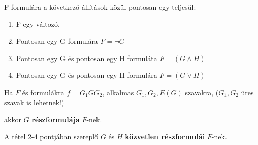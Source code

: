 \documentclass[10pt]{article}
\renewcommand{\\}{\par\noindent}
\begin{document}
\begin{frame}
\begin{tcolorbox}[title={Tétel: Minden formula egyértelműen olvasható}]
F formulára a következő állítások közül pontosan egy teljesül:
\begin{enumerate}
\item F egy változó.
\item Pontosan egy G formulára $F = \neg G$
\item Pontosan egy G és pontosan egy H formuláta $F = (G \land H)$
\item Pontosan egy G és pontosan egy H formulára $F = (G \lor H)$
\end{enumerate}
\end{tcolorbox}
\end{frame}

\begin{frame}
\begin{tcolorbox}[title={Részformula, Közvetlen részformula}]
Ha $F$ és formulákra  $f = G_1GG_2$, alkalmas $G_1, G_2, E(G)$ szavakra, ($G_1, G_2$ üres szavak is lehetnek!)\\
akkor $G$ \textbf{részformulája} $F$-nek.\\
\bigskip
A tétel 2-4 pontjában szereplő $G$ és $H$ \textbf{közvetlen részformulái} $F$-nek.
\end{tcolorbox}
\end{frame}
\end{document}
